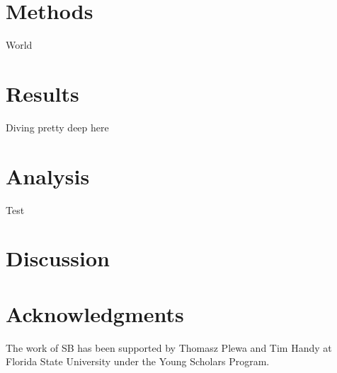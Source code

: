 \documentclass[iop]{emulateapj}
\begin{document}
\section{Methods}
World

\section{Results}
Diving pretty deep here

\section{Analysis}
Test

\section{Discussion}



%
%
%
\section{Acknowledgments}\label{s:ack}
%
The work of SB has been supported by Thomasz Plewa and Tim Handy at Florida State University under the Young Scholars Program.
%
%
%


%
%
%
\end{document}
